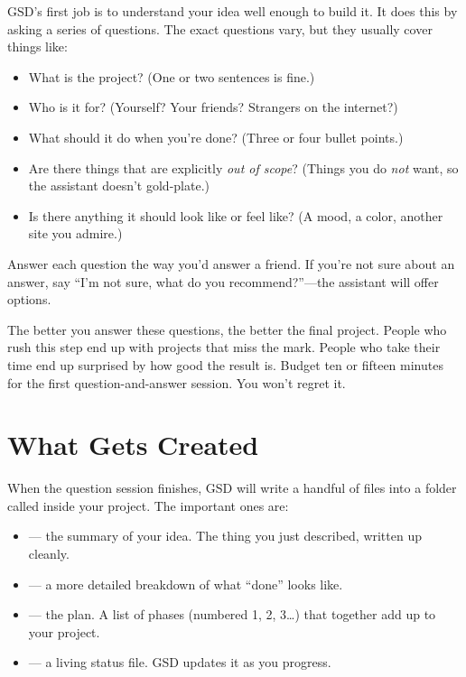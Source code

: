 \documentclass[11pt,letterpaper,openany]{book}
\begin{document}
GSD's first job is to understand your idea well enough to build it. It
does this by asking a series of questions. The exact questions vary, but
they usually cover things like:

\begin{itemize}
  \item What is the project? (One or two sentences is fine.)
  \item Who is it for? (Yourself? Your friends? Strangers on the internet?)
  \item What should it do when you're done? (Three or four bullet points.)
  \item Are there things that are explicitly \emph{out of scope}? (Things
        you do \emph{not} want, so the assistant doesn't gold-plate.)
  \item Is there anything it should look like or feel like? (A mood, a
        color, another site you admire.)
\end{itemize}

Answer each question the way you'd answer a friend. If you're not sure
about an answer, say ``I'm not sure, what do you recommend?''---the
assistant will offer options.

\begin{gsdtip}
The better you answer these questions, the better the final project.
People who rush this step end up with projects that miss the mark. People
who take their time end up surprised by how good the result is. Budget
ten or fifteen minutes for the first question-and-answer session. You
won't regret it.
\end{gsdtip}

\section{What Gets Created}

When the question session finishes, GSD will write a handful of files
into a folder called  inside your project. The
important ones are:

\begin{itemize}
  \item {} --- the summary of your idea. The
        thing you just described, written up cleanly.
  \item {} --- a more detailed breakdown
        of what ``done'' looks like.
  \item {} --- the plan. A list of phases
        (numbered 1, 2, 3\ldots) that together add up to your project.
  \item {} --- a living status file. GSD updates
        it as you progress.
\end{itemize}
\end{document}
